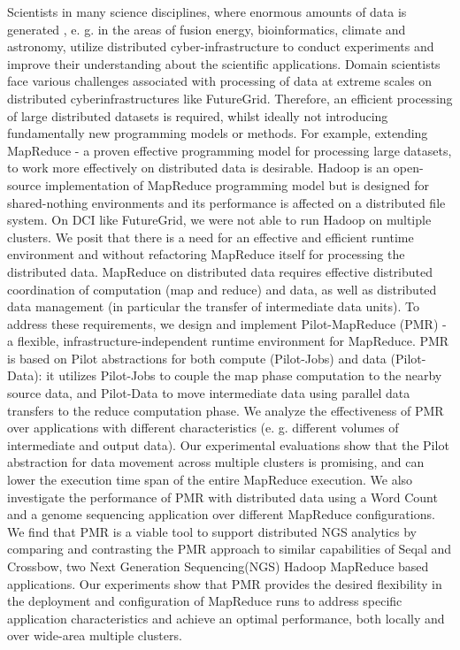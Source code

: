 \documentclass[]{paper}
\begin{document}
Scientists in many science disciplines, where enormous amounts of data is generated , e. g. in the areas of fusion energy, bioinformatics, climate and astronomy, utilize distributed cyber-infrastructure to conduct experiments and improve their understanding about the scientific applications. Domain scientists face various challenges associated with processing of data at extreme scales on distributed cyberinfrastructures like FutureGrid. Therefore, an efficient processing of large distributed datasets is required, whilst ideally not introducing fundamentally new programming models or methods. For example, extending MapReduce - a proven effective programming model for processing large datasets, to work more effectively on distributed data is desirable. Hadoop is an open-source implementation of MapReduce programming model but is designed for shared-nothing environments and its performance is affected on a distributed file system.  On DCI like FutureGrid, we were not able to run Hadoop on multiple clusters.
We posit that there is a need for an effective and efficient runtime environment and without refactoring MapReduce itself for processing the distributed data. MapReduce on distributed data requires effective distributed coordination of computation (map and reduce) and data, as well as distributed data management (in particular the transfer of intermediate data units). To address these requirements, we design and implement Pilot-MapReduce (PMR) - a flexible, infrastructure-independent runtime environment for MapReduce. PMR is based on Pilot abstractions for both compute (Pilot-Jobs) and data (Pilot-Data): it utilizes Pilot-Jobs to couple the map phase computation to the nearby source data, and Pilot-Data to move intermediate data using parallel data transfers to the reduce computation phase. We analyze the effectiveness of PMR over applications with different characteristics (e. g. different volumes of intermediate and output data). Our experimental evaluations show that the Pilot abstraction for data movement across multiple clusters is promising, and can lower the execution time span of the entire MapReduce execution. We also investigate the performance of PMR with distributed data using a Word Count and a genome sequencing application over different MapReduce configurations.  We find that PMR is a viable tool to support distributed NGS analytics by comparing and contrasting the PMR approach to similar capabilities of Seqal and Crossbow, two Next Generation Sequencing(NGS) Hadoop MapReduce based applications. Our experiments show that PMR provides the desired flexibility in the deployment and configuration of MapReduce runs to address specific application characteristics and achieve an optimal performance, both locally and over wide-area multiple clusters.
\end{document}
